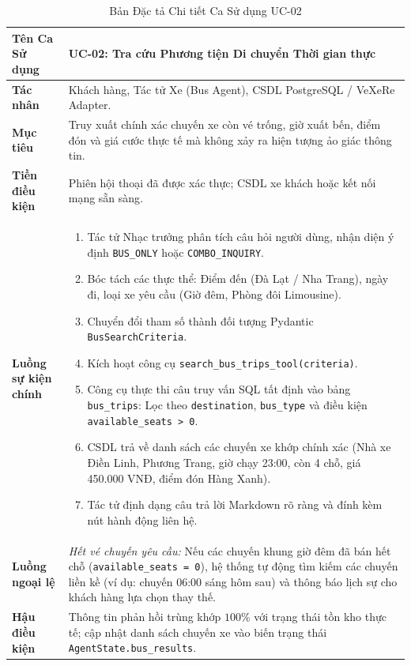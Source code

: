 \begin{table}[h!]
\centering
\small
\begin{tabular}{|p{3.2cm}|p{11.5cm}|}
\hline
\textbf{Tên Ca Sử dụng} & \textbf{UC-02: Tra cứu Phương tiện Di chuyển Thời gian thực} \\
\hline
\textbf{Tác nhân} & Khách hàng, Tác tử Xe (Bus Agent), CSDL PostgreSQL / VeXeRe Adapter. \\
\hline
\textbf{Mục tiêu} & Truy xuất chính xác chuyến xe còn vé trống, giờ xuất bến, điểm đón và giá cước thực tế mà không xảy ra hiện tượng ảo giác thông tin. \\
\hline
\textbf{Tiền điều kiện} & Phiên hội thoại đã được xác thực; CSDL xe khách hoặc kết nối mạng sẵn sàng. \\
\hline
\textbf{Luồng sự kiện chính} & 
\begin{enumerate}
    \item Tác tử Nhạc trưởng phân tích câu hỏi người dùng, nhận diện ý định \texttt{BUS\_ONLY} hoặc \texttt{COMBO\_INQUIRY}.
    \item Bóc tách các thực thể: Điểm đến (Đà Lạt / Nha Trang), ngày đi, loại xe yêu cầu (Giờ đêm, Phòng đôi Limousine).
    \item Chuyển đổi tham số thành đối tượng Pydantic \texttt{BusSearchCriteria}.
    \item Kích hoạt công cụ \texttt{search\_bus\_trips\_tool(criteria)}.
    \item Công cụ thực thi câu truy vấn SQL tất định vào bảng \texttt{bus\_trips}: Lọc theo \texttt{destination}, \texttt{bus\_type} và điều kiện \texttt{available\_seats > 0}.
    \item CSDL trả về danh sách các chuyến xe khớp chính xác (Nhà xe Điền Linh, Phương Trang, giờ chạy 23:00, còn 4 chỗ, giá 450.000 VNĐ, điểm đón Hàng Xanh).
    \item Tác tử định dạng câu trả lời Markdown rõ ràng và đính kèm nút hành động liên hệ.
\end{enumerate} \\
\hline
\textbf{Luồng ngoại lệ} & 
\textit{Hết vé chuyến yêu cầu:} Nếu các chuyến khung giờ đêm đã bán hết chỗ (\texttt{available\_seats = 0}), hệ thống tự động tìm kiếm các chuyến liền kề (ví dụ: chuyến 06:00 sáng hôm sau) và thông báo lịch sự cho khách hàng lựa chọn thay thế. \\
\hline
\textbf{Hậu điều kiện} & Thông tin phản hồi trùng khớp $100\%$ với trạng thái tồn kho thực tế; cập nhật danh sách chuyến xe vào biến trạng thái \texttt{AgentState.bus\_results}. \\
\hline
\end{tabular}
\caption{Bản Đặc tả Chi tiết Ca Sử dụng UC-02}
\label{tab:spec_uc02}
\end{table}

